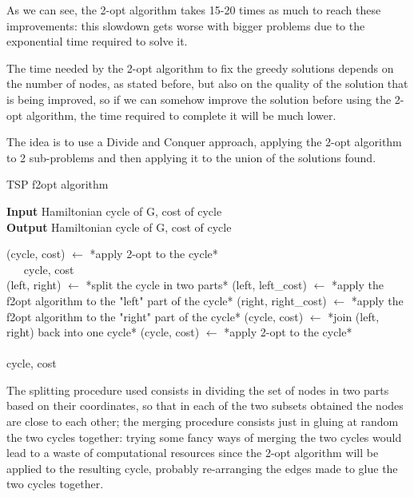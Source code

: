 As we can see, the 2-opt algorithm takes 15-20 times as much to reach these improvements: this slowdown gets worse with bigger problems due to the exponential time required to solve it.

The time needed by the 2-opt algorithm to fix the greedy solutions depends on the number of nodes, as stated before, but also on the quality of the solution that is being improved, so if we can somehow improve the solution before using the 2-opt algorithm, the time required to complete it will be much lower.

The idea is to use a Divide and Conquer approach, applying the 2-opt algorithm to 2 sub-problems and then applying it to the union of the solutions found.

\begin{algorithm}
    \caption{TSP f2opt algorithm}

    \textbf{Input} Hamiltonian cycle of G, cost of cycle\\
    \textbf{Output} Hamiltonian cycle of G, cost of cycle\\
    \begin{algorithmic}

            \State (cycle, cost) $\gets$ *apply 2-opt to the cycle*\\
            $\quad\;\;$\Return cycle, cost
        \EndIf\\

            \State (left, right) $\gets$ *split the cycle in two parts*
            \State (left, left\_cost) $\gets$ *apply the f2opt algorithm to the "left" part of the cycle*
            \State (right, right\_cost) $\gets$ *apply the f2opt algorithm to the "right" part of the cycle*
            \State (cycle, cost) $\gets$ *join (left, right) back into one cycle*
            \State (cycle, cost) $\gets$ *apply 2-opt to the cycle*
        \EndWhile\\\\

        \Return cycle, cost

    \end{algorithmic}
\end{algorithm}

\newpage

The splitting procedure used consists in dividing the set of nodes in two parts based on their coordinates, so that in each of the two subsets obtained the nodes are close to each other; the merging procedure consists just in gluing at random the two cycles together: trying some fancy ways of merging the two cycles would lead to a waste of computational resources since the 2-opt algorithm will be applied to the resulting cycle, probably re-arranging the edges made to glue the two cycles together.\\

